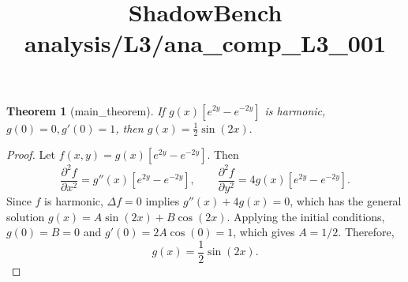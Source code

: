 \documentclass{article}
\title{ShadowBench analysis/L3/ana\_comp\_L3\_001}
\newtheorem{theorem}{Theorem}
\begin{document}
\maketitle

\begin{theorem}[main_theorem]
If $g(x)[e^{2y} - e^{-2y}]$ is harmonic, $g(0) = 0, g'(0) = 1$, then $g(x)=\frac{1}{2}\sin(2x).$
\end{theorem}

\begin{proof}
Let $f(x,y) = g(x)[e^{2y} - e^{-2y}]$. Then
\[
\frac{\partial^2 f}{\partial x^2} = g''(x)[e^{2y} - e^{-2y}], \qquad \frac{\partial^2 f}{\partial y^2} = 4g(x)[e^{2y} - e^{-2y}].
\]
Since $f$ is harmonic, $\Delta f = 0$ implies $g''(x) + 4g(x) = 0$, which has the general solution $g(x) = A\sin(2x) + B\cos(2x)$. 
Applying the initial conditions, $g(0) = B = 0$ and $g'(0) = 2A\cos(0) = 1$, which gives $A = 1/2$. Therefore,
\[
g(x) = \frac{1}{2}\sin(2x).
\]
\end{proof}
\end{document}
